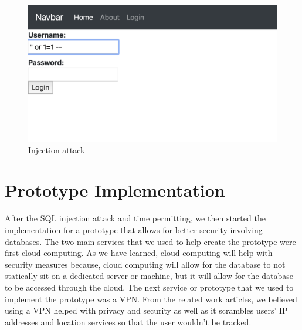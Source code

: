 \bigskip
\bigskip
\begin{figure}[hbt!]
\centering
\includegraphics[width=5in]{../images/sql-injection1.png}%
\caption{Injection attack}
\label{fig:injection attack}
\end{figure}
\bigskip
\bigskip

\section{Prototype Implementation}
\label{sec:prototype implementation}


After the SQL injection attack and time permitting, we then started the implementation
for a prototype that allows for better security involving databases. The two main services that we used to help create the prototype were first cloud computing. As we have learned, cloud computing will help with security measures because, cloud computing will allow for the database to not statically sit
on a dedicated server or machine, but it will allow for the database to be accessed
through the cloud. The next service or prototype that we used to implement the prototype was a VPN. From the related work articles, we believed using a VPN helped
with privacy and security as well as it scrambles users' IP addresses and location services so
that the user wouldn't be tracked.

